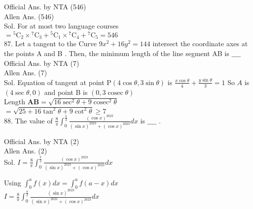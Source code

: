 \documentclass[10pt]{article}
\begin{document}
Official Ans. by NTA (546)\\
Allen Ans. (546)\\
Sol. For at most two language courses\\
\(={ }^{5} \mathrm{C}_{2} \times{ }^{7} \mathrm{C}_{3}+{ }^{5} \mathrm{C}_{1} \times{ }^{7} \mathrm{C}_{4}+{ }^{7} \mathrm{C}_{5}=546\)\\
87. Let a tangent to the Curve \(9 x^{2}+16 y^{2}=144\) intersect the coordinate axes at the points A and B . Then, the minimum length of the line segment AB is \(\_\_\_\_\)\\
Official Ans. by NTA (7)\\
Allen Ans. (7)\\
Sol. Equation of tangent at point \(\mathrm{P}(4 \cos \theta, 3 \sin \theta)\) is \(\frac{x \cos \theta}{4}+\frac{y \sin \theta}{3}=1\) So \(A\) is \((4 \sec \theta, 0)\) and point B is \((0,3 \operatorname{cosec} \theta)\)\\
Length \(\mathbf{A B}=\sqrt{16 \sec ^{2} \theta+9 \operatorname{cosec}^{2} \theta}\)\\
\(=\sqrt{25+16 \tan ^{2} \theta+9 \cot ^{2} \theta} \geq 7\)\\
88. The value of \(\frac{8}{\pi} \int_{0}^{\frac{\pi}{2}} \frac{(\cos x)^{2023}}{(\sin x)^{2023}+(\cos x)^{2023}} d x\) is \(\_\_\_\_\) .

Official Ans. by NTA (2)\\
Allen Ans. (2)\\
Sol. \(I=\frac{8}{\pi} \int_{0}^{\frac{\pi}{2}} \frac{(\cos x)^{2023}}{(\sin x)^{2023}+(\cos x)^{2023}} d x\)

Using \(\int_{0}^{a} f(x) d x=\int_{0}^{a} f(a-x) d x\)\\
\(I=\frac{8}{\pi} \int_{0}^{\frac{\pi}{2}} \frac{(\sin x)^{2023}}{(\sin x)^{2023}+(\cos x)^{2023}} d x\)
\end{document}
